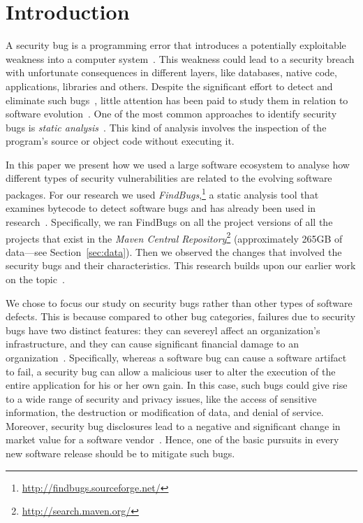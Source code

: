 \documentclass[conference]{llncs}
\begin{document}
\section{Introduction}

A security bug is a programming error that introduces a potentially exploitable
weakness into a computer system~\cite{SSL12}\cite{TJBD11}\cite{M06}. This
weakness could lead to a security breach with unfortunate consequences in
different layers, like databases, native code, applications, libraries and
others. Despite the significant effort to detect and eliminate such
bugs~\cite{SZ12}, little attention has been paid to study them in relation to
software evolution~\cite{L96}\cite{LRWPT97}\cite{IB06}\cite{RGMA06}. 
One of the most common approaches to identify security bugs is
{\it static analysis}~\cite{CW07}. This kind of analysis involves the
inspection of the program's source or object code without executing
it. 

In this
paper we present how we used a large software ecosystem to analyse how different
types of security vulnerabilities are related to the evolving software packages.
For our research we used {\it FindBugs},\footnote{\url{http://findbugs.sourceforge.net/}}
a static analysis tool that examines bytecode to detect software bugs and has already been used in
research~\cite{AP10}\cite{HP07}\cite{HP04}\cite{HW08}\cite{SHP06}.
Specifically, we ran FindBugs on all the project
versions of all the projects that exist in the
{\it Maven Central Repository}\footnote{\url{http://search.maven.org/}}
(approximately 265GB of data---see Section~\ref{sec:data}).
Then we observed the changes that involved the security bugs and their characteristics.
This research builds upon our earlier work on the topic~\cite{MGS12}.

We chose to focus our study on security bugs rather than other types of
software defects. This is because compared to other bug categories,
failures due to security bugs have two distinct features:
they can severeyl affect an organization's infrastructure\cite{SZ12}, and
they can cause significant financial damage to
an organization~\cite{TH04}\cite{BCL08}\cite{R06}. 
Specifically,
whereas a software bug can cause a software artifact to fail,
a security bug can allow a malicious user to alter the execution
of the entire application for his or her own gain.
In this case, such bugs could give rise to a wide
range of security and privacy issues, like
the access of sensitive information,
the destruction or modification of data, and
denial of service.
Moreover, security bug disclosures lead to a negative and significant change
in market value for a software vendor~\cite{TW07}.
Hence, one of the basic pursuits in every new software release should
be to mitigate such bugs.
\end{document}
